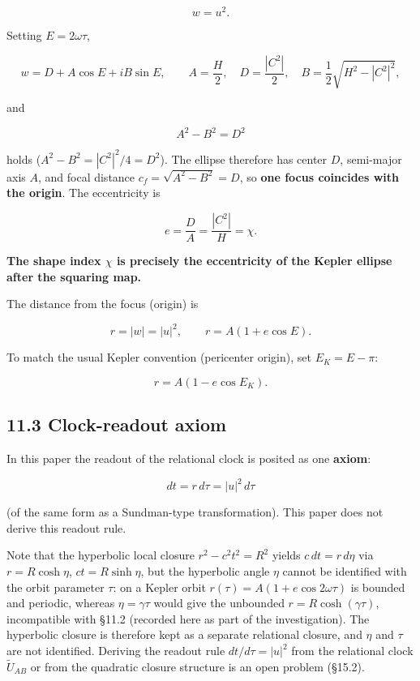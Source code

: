 \documentclass[
  a4paper,
]{article}
\begin{document}
\[
\boxed{w=u^2}.
\]

Setting \(E=2\omega\tau\),

\[
w=D+A\cos E+iB\sin E,
\qquad
A=\frac H2,\quad
D=\frac{|C^2|}2,\quad
B=\frac12\sqrt{H^2-|C^2|^2},
\]

and

\[
\boxed{A^2-B^2=D^2}
\]

holds (\(A^2-B^2=|C^2|^2/4=D^2\)). The ellipse therefore has center
\(D\), semi-major axis \(A\), and focal distance
\(c_f=\sqrt{A^2-B^2}=D\), so \textbf{one focus coincides with the
origin}. The eccentricity is

\[
\boxed{
e=\frac DA=\frac{|C^2|}{H}=\chi
}.
\]

\textbf{The shape index \(\chi\) is precisely the eccentricity of the
Kepler ellipse after the squaring map.}

The distance from the focus (origin) is

\[
\boxed{r=|w|=|u|^2},
\qquad
r=A(1+e\cos E).
\]

To match the usual Kepler convention (pericenter origin), set
\(E_K=E-\pi\):

\[
r=A(1-e\cos E_K).
\]

\subsection{11.3 Clock-readout axiom}\label{clock-readout-axiom}

In this paper the readout of the relational clock is posited as one
\textbf{axiom}:

\[
\boxed{dt=r\,d\tau=|u|^2\,d\tau}
\]

(of the same form as a Sundman-type transformation). This paper does not
derive this readout rule.

Note that the hyperbolic local closure \(r^2-c^2t^2=R^2\) yields
\(c\,dt=r\,d\eta\) via \(r=R\cosh\eta\), \(ct=R\sinh\eta\), but the
hyperbolic angle \(\eta\) cannot be identified with the orbit parameter
\(\tau\): on a Kepler orbit \(r(\tau)=A(1+e\cos2\omega\tau)\) is bounded
and periodic, whereas \(\eta=\gamma\tau\) would give the unbounded
\(r=R\cosh(\gamma\tau)\), incompatible with §11.2 (recorded here as part
of the investigation). The hyperbolic closure is therefore kept as a
separate relational closure, and \(\eta\) and \(\tau\) are not
identified. Deriving the readout rule \(dt/d\tau=|u|^2\) from the
relational clock \(\tilde U_{AB}\) or from the quadratic closure
structure is an open problem (§15.2).
\end{document}
